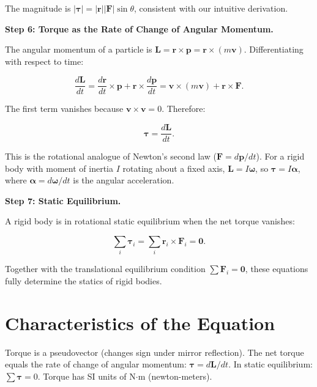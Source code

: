 The magnitude is $|\boldsymbol{\tau}| = |\mathbf{r}||\mathbf{F}|\sin\theta$, consistent with our intuitive derivation.

\textbf{Step 6: Torque as the Rate of Change of Angular Momentum.}

The angular momentum of a particle is $\mathbf{L} = \mathbf{r} \times \mathbf{p} = \mathbf{r} \times (m\mathbf{v})$. Differentiating with respect to time:

\begin{equation}
\frac{d\mathbf{L}}{dt} = \frac{d\mathbf{r}}{dt} \times \mathbf{p} + \mathbf{r} \times \frac{d\mathbf{p}}{dt} = \mathbf{v} \times (m\mathbf{v}) + \mathbf{r} \times \mathbf{F}.
\end{equation}

The first term vanishes because $\mathbf{v} \times \mathbf{v} = 0$. Therefore:

\begin{equation}
\boxed{\boldsymbol{\tau} = \frac{d\mathbf{L}}{dt}.}
\end{equation}

This is the rotational analogue of Newton's second law ($\mathbf{F} = d\mathbf{p}/dt$). For a rigid body with moment of inertia $I$ rotating about a fixed axis, $\mathbf{L} = I\boldsymbol{\omega}$, so $\boldsymbol{\tau} = I\boldsymbol{\alpha}$, where $\boldsymbol{\alpha} = d\boldsymbol{\omega}/dt$ is the angular acceleration.

\textbf{Step 7: Static Equilibrium.}

A rigid body is in rotational static equilibrium when the net torque vanishes:

\begin{equation}
\sum_i \boldsymbol{\tau}_i = \sum_i \mathbf{r}_i \times \mathbf{F}_i = \mathbf{0}.
\end{equation}

Together with the translational equilibrium condition $\sum \mathbf{F}_i = \mathbf{0}$, these equations fully determine the statics of rigid bodies.

\section*{Characteristics of the Equation}

Torque is a pseudovector (changes sign under mirror reflection). The net torque equals the rate of change of angular momentum: $\boldsymbol{\tau} = d\mathbf{L}/dt$. In static equilibrium: $\sum \boldsymbol{\tau} = 0$. Torque has SI units of N$\cdot$m (newton-meters).
